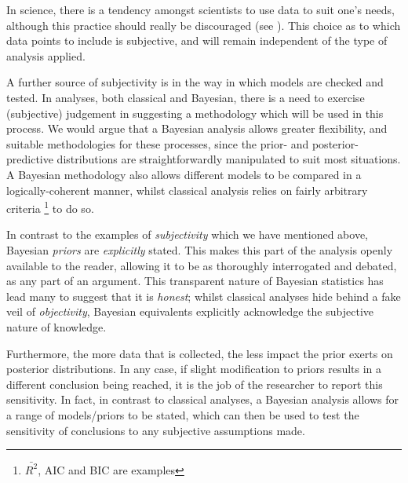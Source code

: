 \documentclass[11pt,fullpage]{book}
\begin{document}
In science, there is a tendency amongst scientists to use data to suit one's needs, although this practice should really be discouraged (see \cite{ioannidis2005most}). This choice as to which data points to include is subjective, and will remain independent of the type of analysis applied. 

A further source of subjectivity is in the way in which models are checked and tested. In analyses, both classical and Bayesian, there is a need to exercise (subjective) judgement in suggesting a methodology which will be used in this process. We would argue that a Bayesian analysis allows greater flexibility, and suitable methodologies for these processes, since the prior- and posterior- predictive distributions are straightforwardly manipulated to suit most situations. A Bayesian methodology also allows different models to be compared in a logically-coherent manner, whilst classical analysis relies on fairly arbitrary criteria \footnote{$\bar{R^2}$, AIC and BIC are examples} to do so.

In contrast to the examples of \textit{subjectivity} which we have mentioned above, Bayesian \textit{priors} are \textit{explicitly} stated. This makes this part of the analysis openly available to the reader, allowing it to be as thoroughly interrogated and debated, as any part of an argument. This transparent nature of Bayesian statistics has lead many to suggest that it is \textit{honest}; whilst classical analyses hide behind a fake veil of \textit{objectivity}, Bayesian equivalents explicitly acknowledge the subjective nature of knowledge.

Furthermore, the more data that is collected, the less impact the prior exerts on posterior distributions. In any case, if slight modification to priors results in a different conclusion being reached, it is the job of the researcher to report this sensitivity. In fact, in contrast to classical analyses, a Bayesian analysis allows for a range of models/priors to be stated, which can then be used to test the sensitivity of conclusions to any subjective assumptions made.
\end{document}
